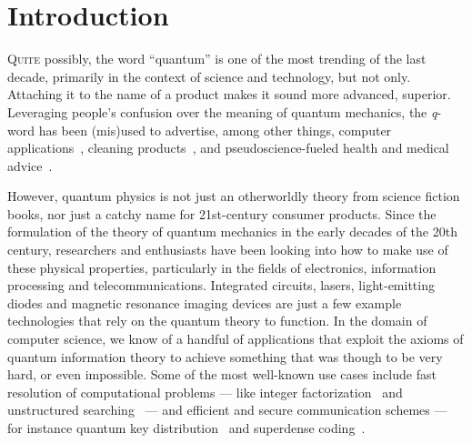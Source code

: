 \chapter{Introduction}
\label{chp:intro}

\lettrine{Q}{uite} possibly, the word ``quantum'' is one of the most trending of the last decade,
primarily in the context of science and technology, but not only. Attaching it to the name of a
product makes it sound more advanced, superior. Leveraging people's confusion over the meaning of
quantum mechanics, the \emph{q}-word has been (mis)used to advertise, among other things, computer
applications~\cite{firefox_quantum}, cleaning products~\cite{finish_quantum}, and
pseudoscience-fueled health and medical advice~\cite{milgrom_2002_patient}.

However, quantum physics is not just an otherworldly theory from science fiction books, nor just a
catchy name for 21st-century consumer products. Since the formulation of the theory of quantum
mechanics in the early decades of the 20th century, researchers and enthusiasts have been looking
into how to make use of these physical properties, particularly in the fields of electronics,
information processing and telecommunications. Integrated circuits, lasers, light-emitting diodes
and magnetic resonance imaging devices are just a few example technologies that rely on the quantum
theory to function. In the domain of computer science, we know of a handful of applications that
exploit the axioms of quantum information theory to achieve something that was though to be very
hard, or even impossible. Some of the most well-known use cases include fast resolution of
computational problems --- like integer factorization~\cite{shor_1994_algorithms} and unstructured
searching~\cite{grover_1996_search} --- and efficient and secure communication schemes --- for
instance quantum key distribution~\cite{bennett_2014_bb84, ekert_1991_e91} and superdense
coding~\cite{bennett_1992_communication}.

